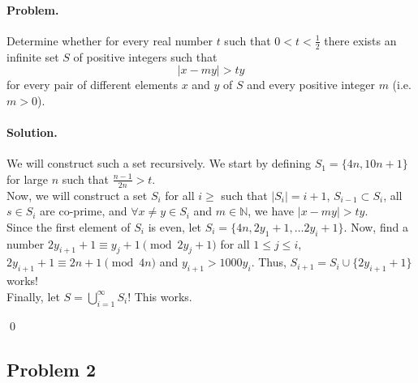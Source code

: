 \documentclass[12pt]{article}
\newenvironment{solution}
{\paragraph{Solution.}}
{\qed\eject}
\newcommand*{\NN}{\mathbb{N}}
\begin{document}
\paragraph*{\textbf{Problem.}} Determine whether for every real number $t$ such that $0 < t < \tfrac{1}{2} $ there exists an infinite set $S$ of positive integers such that\[|x-my| > ty\]for every pair of different elements $x$ and $y$ of $S$ and every positive integer $m$ (i.e. $m > 0$).

\begin{solution}
    We will construct such a set recursively. We start by defining $S_1=\{4n,10n+1\}$ for large $n$ such that $\frac{n-1}{2n}>t$.\\
    
    Now, we will construct a set $S_i$ for all $i\ge$ such that $|S_i|=i+1$, $S_{i-1}\subset S_i$, all $s\in S_i$ are co-prime, and $\forall x\ne y \in S_i$ and $m\in \NN$, we have $|x-my|>ty$.\\

    Since the first element of $S_i$ is even, let $S_i=\{4n, 2y_1+1,\ldots 2y_i+1\}$. Now, find a number $2y_{i+1}+1\equiv y_j+1\pmod{2y_j+1}$ for all $1\le j\le i$, $2y_{i+1}+1\equiv 2n+1\pmod{4n}$ and $y_{i+1}>1000y_i$. Thus, $S_{i+1}=S_i\cup \{2y_{i+1}+1\}$ works!\\

    Finally, let $S=\bigcup\limits_{i=1}^{\infty} S_i$! This works.

\end{solution}

\subsection*{Problem 2}
\end{document}
